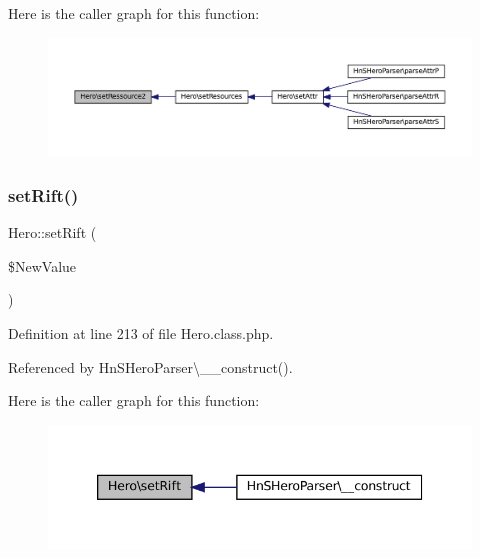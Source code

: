 Here is the caller graph for this function\+:\nopagebreak
\begin{figure}[H]
\begin{center}
\leavevmode
\includegraphics[width=350pt]{class_hero_a11a02ea8b3c6109f3951fac1c37288ec_icgraph}
\end{center}
\end{figure}
\mbox{\label{class_hero_a6fe63a5d6d2b9c2353b049492d443f64}} 
\subsubsection{\texorpdfstring{set\+Rift()}{setRift()}}
{\footnotesize\ttfamily Hero\+::set\+Rift (\begin{DoxyParamCaption}\item[{}]{\$\+New\+Value }\end{DoxyParamCaption})}



Definition at line 213 of file Hero.\+class.\+php.



Referenced by Hn\+S\+Hero\+Parser\textbackslash{}\+\_\+\+\_\+construct().

Here is the caller graph for this function\+:\nopagebreak
\begin{figure}[H]
\begin{center}
\leavevmode
\includegraphics[width=339pt]{class_hero_a6fe63a5d6d2b9c2353b049492d443f64_icgraph}
\end{center}
\end{figure}
\mbox{\label{class_hero_abfb17e0fc088df407d18bb6a83a5ee36}} 
